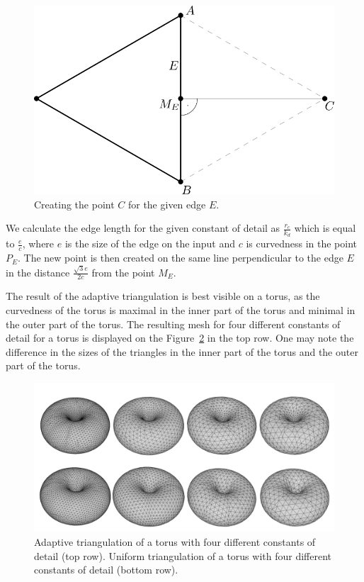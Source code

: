 \begin{figure}
    \centerline{\includegraphics[scale=0.5]{images/img57}}
    \caption[Creating the point $C$]
    {Creating the point $C$ for the given edge $E$.}
    \label{img:57}
\end{figure}

We calculate the edge length for the given constant of detail as $\frac{r_c}{k_d}$
which is equal to $\frac{e}{c}$, where $e$ is the size of the edge on the input 
and $c$ is curvedness in the point $P_E$. The new point is then created on the same
line perpendicular to the edge $E$ in the distance $\frac{\sqrt{3}e}{2c}$ from the point
$M_E$.

The result of the adaptive triangulation is best visible on a torus, as the curvedness
of the torus is maximal in the inner part of the torus and minimal in the outer part of the torus.
The resulting mesh for four different constants of detail for a torus is displayed on the
Figure~\ref{img:58} in the top row. One may note the difference in the sizes of the 
triangles in the inner
part of the torus and the outer part of the torus.

\begin{figure}[h!]
    \centerline{\includegraphics[scale=0.5]{images/img58}}
    \caption[Adaptive triangulation of a torus]
    {Adaptive triangulation of a torus with four different constants of detail (top row).
    Uniform triangulation of a torus with four different constants of detail (bottom row).}
    \label{img:58}
\end{figure}

